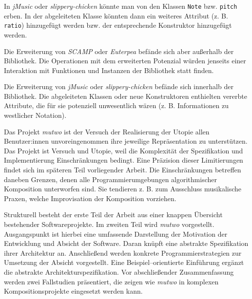 \documentclass[12pt,a4paper,ngerman]{article}
\begin{document}
In \emph{jMusic} oder \emph{slippery-chicken} könnte man von den Klassen \texttt{Note} bzw. \texttt{pitch} erben.
In der abgeleiteten Klasse könnten dann ein weiteres Attribut (z. B. \texttt{ratio}) hinzugefügt werden bzw. der entsprechende Konstruktor hinzugefügt werden.

\smallskip

Die Erweiterung von \emph{SCAMP} oder \emph{Euterpea} befände sich aber außerhalb der Bibliothek.
Die Operationen mit dem erweiterten Potenzial würden jenseits einer Interaktion mit Funktionen und Instanzen der Bibliothek statt finden.

\smallskip

Die Erweiterung von \emph{jMusic} oder \emph{slippery-chicken} befände sich innerhalb der Bibliothek.
Die abgeleiteten Klassen oder neue Konstruktoren enthielten vererbte Attribute, die für sie potenziell unwesentlich wären (z. B. Informationen zu westlicher Notation).

\bigskip

Das Projekt \emph{mutwo} ist der Versuch der Realisierung der Utopie allen Benutzer:innen unvoreingenommen ihre jeweilige Repräsentation zu unterstützen.
Das Projekt ist Versuch und Utopie, weil die Komplexität der Spezifikation und Implementierung Einschränkungen bedingt.
Eine Präzision dieser Limitierungen findet sich im späteren Teil vorliegender Arbeit.
Die Einschränkungen betreffen daneben Grenzen, denen alle Programmierumgebungen algorithmischer Komposition unterworfen sind.
Sie tendieren z. B. zum Ausschluss musikalische Praxen, welche Improvisation der Komposition vorziehen.

\bigskip

Strukturell besteht der erste Teil der Arbeit aus einer knappen Übersicht bestehender Softwareprojekte.
Im zweiten Teil wird \emph{mutwo} vorgestellt.
Ausgangspunkt ist hierbei eine umfassende Darstellung der Motivation der Entwicklung und Absicht der Software.
Daran knüpft eine abstrakte Spezifikation ihrer Architektur an.
Anschließend werden konkrete Programmierstrategien zur Umsetzung der Absicht vorgestellt.
Eine Beispiel--orientierte Einführung ergänzt die abstrakte Architekturspezifikation.
Vor abschließender Zusammenfassung werden zwei Fallstudien präsentiert, die zeigen wie \emph{mutwo} in komplexen Kompositionsprojekte eingesetzt werden kann.

%
\end{document}
